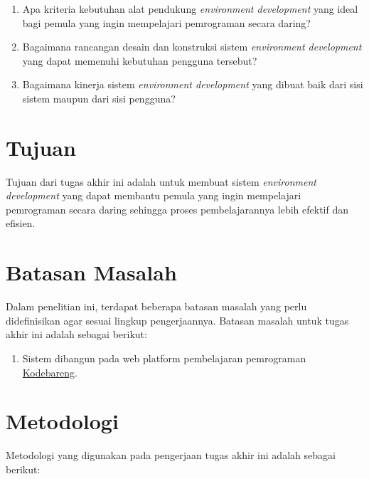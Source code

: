 \begin{enumerate}
    \item Apa kriteria kebutuhan alat pendukung \textit{environment development} yang ideal bagi pemula yang ingin mempelajari pemrograman secara daring?
    \item Bagaimana rancangan desain dan konstruksi sistem \textit{environment development} yang dapat memenuhi kebutuhan pengguna tersebut?
    \item Bagaimana kinerja sistem \textit{environment development} yang dibuat baik dari sisi sistem maupun dari sisi pengguna?
\end{enumerate}

\section{Tujuan}
Tujuan dari tugas akhir ini adalah untuk membuat sistem \textit{environment development} yang dapat membantu pemula yang ingin mempelajari pemrograman secara daring sehingga proses pembelajarannya lebih efektif dan efisien.

\section{Batasan Masalah}
Dalam penelitian ini, terdapat beberapa batasan masalah yang perlu didefinisikan agar sesuai lingkup pengerjaannya. Batasan masalah untuk tugas akhir ini adalah sebagai berikut:

\begin{enumerate}
    \item Sistem dibangun pada web platform pembelajaran pemrograman \href{https://kodebareng.id}{Kodebareng}.
\end{enumerate}

\section{Metodologi}
Metodologi yang digunakan pada pengerjaan tugas akhir ini adalah sebagai berikut:

